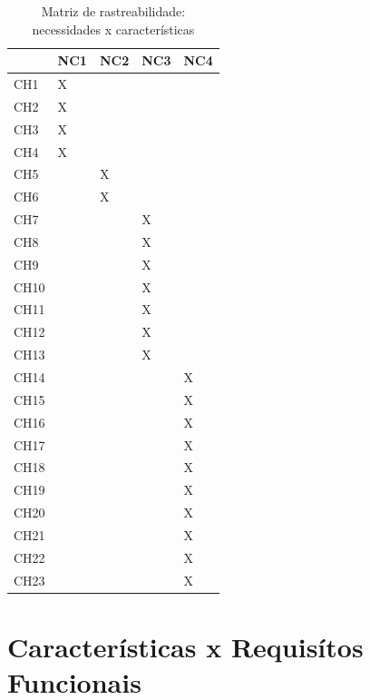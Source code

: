 \begin{table}[H]
  \centering
  \caption{Matriz de rastreabilidade: necessidades x características}
  \label{nc-ch}
  \begin{tabular}{|l|l|l|l|l|}
    \hline
         & NC1 & NC2 & NC3 & NC4 \\ \hline
    CH1  &  X   &     &     &     \\ \hline
    CH2  &  X   &     &     &     \\ \hline
    CH3  &  X   &     &     &     \\ \hline
    CH4  &  X   &     &     &     \\ \hline
    CH5  &     &  X   &     &     \\ \hline
    CH6  &     &  X   &     &     \\ \hline
    CH7  &     &     &  X   &     \\ \hline
    CH8  &     &     &  X  &     \\ \hline
    CH9  &     &     &  X   &     \\ \hline
    CH10 &     &     &  X   &     \\ \hline
    CH11 &     &     &  X   &     \\ \hline
    CH12 &     &     &  X   &     \\ \hline
    CH13 &     &     &  X   &     \\ \hline
    CH14 &     &     &     &   X  \\ \hline
    CH15 &     &     &     &   X  \\ \hline
    CH16 &     &     &     &   X  \\ \hline
    CH17 &     &     &     &   X  \\ \hline
    CH18 &     &     &     &   X  \\ \hline
    CH19 &     &     &     &   X  \\ \hline
    CH20 &     &     &     &   X  \\ \hline
    CH21 &     &     &     &   X  \\ \hline
    CH22 &     &     &     &   X  \\ \hline
    CH23 &     &     &     &   X  \\ \hline
  \end{tabular}
\end{table}

\section{Características x Requisítos Funcionais}

